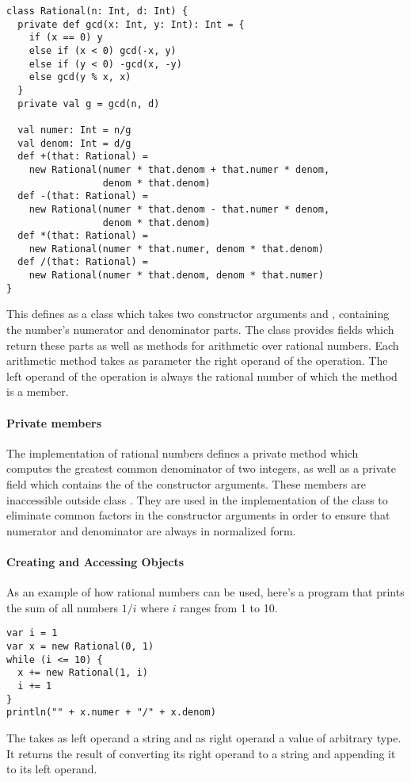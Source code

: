 \begin{lstlisting}
class Rational(n: Int, d: Int) {
  private def gcd(x: Int, y: Int): Int = {
    if (x == 0) y
    else if (x < 0) gcd(-x, y)
    else if (y < 0) -gcd(x, -y)
    else gcd(y % x, x)
  }
  private val g = gcd(n, d)

  val numer: Int = n/g
  val denom: Int = d/g
  def +(that: Rational) =
    new Rational(numer * that.denom + that.numer * denom,
                 denom * that.denom)
  def -(that: Rational) =
    new Rational(numer * that.denom - that.numer * denom, 
                 denom * that.denom)
  def *(that: Rational) =
    new Rational(numer * that.numer, denom * that.denom)
  def /(that: Rational) =
    new Rational(numer * that.denom, denom * that.numer)
}
\end{lstlisting}
This defines  as a class which takes two constructor
arguments  and , containing the number's numerator and
denominator parts.  The class provides fields which return these parts
as well as methods for arithmetic over rational numbers.  Each
arithmetic method takes as parameter the right operand of the
operation. The left operand of the operation is always the rational
number of which the method is a member.

\paragraph{Private members}
The implementation of rational numbers defines a private method
 which computes the greatest common denominator of two
integers, as well as a private field  which contains the
 of the constructor arguments. These members are inaccessible
outside class . They are used in the implementation of
the class to eliminate common factors in the constructor arguments in
order to ensure that numerator and denominator are always in
normalized form.

\paragraph{Creating and Accessing Objects}
As an example of how rational numbers can be used, here's a program
that prints the sum of all numbers $1/i$ where $i$ ranges from 1 to 10.
\begin{lstlisting}
var i = 1
var x = new Rational(0, 1)
while (i <= 10) {
  x += new Rational(1, i)
  i += 1
}
println("" + x.numer + "/" + x.denom)
\end{lstlisting}
The \code{+} takes as left operand a string and as right operand a
value of arbitrary type. It returns the result of converting its right
operand to a string and appending it to its left operand. 
  
